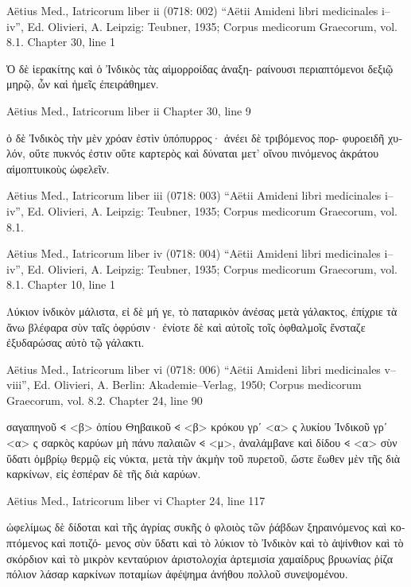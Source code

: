 \documentclass[12pt,letterpaper,twoside,final]{memoir}
\begin{document}
\begin{greek}
Aëtius Med., Iatricorum liber ii (0718: 002)
“Aëtii Amideni libri medicinales i–iv”, Ed. Olivieri, A.
Leipzig: Teubner, 1935; Corpus medicorum Graecorum, vol. 8.1.
Chapter 30, line 1

                Ὁ δὲ ἱερακίτης καὶ ὁ Ἰνδικὸς τὰς αἱμορροίδας ἀναξη-
ραίνουσι περιαπτόμενοι δεξιῷ μηρῷ, ὧν καὶ ἡμεῖς ἐπειράθημεν. 



Aëtius Med., Iatricorum liber ii 
Chapter 30, line 9

                                                                                ὁ 
δὲ Ἰνδικὸς τὴν μὲν χρόαν ἐστὶν ὑπόπυρρος· ἀνέει δὲ τριβόμενος πορ-
φυροειδῆ χυλόν, οὔτε πυκνός ἐστιν οὔτε καρτερὸς καὶ δύναται μετ' 
οἴνου πινόμενος ἀκράτου αἱμοπτυικοὺς ὠφελεῖν. 



Aëtius Med., Iatricorum liber iii (0718: 003)
“Aëtii Amideni libri medicinales i–iv”, Ed. Olivieri, A.
Leipzig: Teubner, 1935; Corpus medicorum Graecorum, vol. 8.1.


Aëtius Med., Iatricorum liber iv (0718: 004)
“Aëtii Amideni libri medicinales i–iv”, Ed. Olivieri, A.
Leipzig: Teubner, 1935; Corpus medicorum Graecorum, vol. 8.1.
Chapter 10, line 1

                                 Λύκιον ἰνδικὸν μάλιστα, εἰ δὲ μή γε, 
τὸ παταρικὸν ἀνέσας μετὰ γάλακτος, ἐπίχριε τὰ ἄνω βλέφαρα σὺν ταῖς 
ὀφρύσιν· ἐνίοτε δὲ καὶ αὐτοῖς τοῖς ὀφθαλμοῖς ἔνσταζε ἐξυδαρώσας αὐτὸ 
τῷ γάλακτι. 






Aëtius Med., Iatricorum liber vi (0718: 006)
“Aëtii Amideni libri medicinales v–viii”, Ed. Olivieri, A.
Berlin: Akademie–Verlag, 1950; Corpus medicorum Graecorum, vol. 8.2.
Chapter 24, line 90

        σαγαπηνοῦ 𐅻 <β> ὀπίου Θηβαικοῦ 𐅻 <β> κρόκου γρʹ <α> ς λυκίου Ἰνδικοῦ 
γρʹ <α> ς σαρκὸς καρύων μὴ πάνυ παλαιῶν 𐅻 <μ>, ἀναλάμβανε καὶ δίδου   
𐅻 <α> σὺν ὕδατι ὀμβρίῳ θερμῷ εἰς νύκτα, μετὰ τὴν ἀκμὴν τοῦ πυρετοῦ, 
ὥστε ἕωθεν μὲν τῆς διὰ καρκίνων, εἰς ἑσπέραν δὲ τῆς διὰ καρύων. 



Aëtius Med., Iatricorum liber vi 
Chapter 24, line 117

                                                ὠφελίμως δὲ δίδοται καὶ τῆς ἀγρίας 
συκῆς ὁ φλοιὸς τῶν ῥάβδων ξηραινόμενος καὶ κοπτόμενος καὶ ποτιζό-
μενος σὺν ὕδατι καὶ τὸ λύκιον τὸ Ἰνδικὸν καὶ τὸ ἀψίνθιον καὶ τὸ 
σκόρδιον καὶ τὸ μικρὸν κενταύριον ἀριστολοχία ἀρτεμισία χαμαίδρυς   
βρυωνίας ῥίζα πόλιον λάσαρ καρκίνων ποταμίων ἀφέψημα ἀνήθου 
πολλοῦ συνεψομένου. 





\end{greek}
\end{document}
